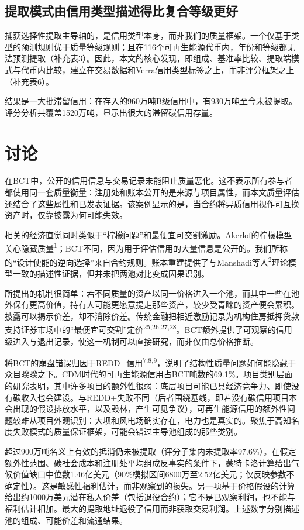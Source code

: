 \documentclass[12pt,a4paper]{article}
\begin{document}
\subsection*{提取模式由信用类型描述得比复合等级更好}

捕获选择性提取主导轴的，是信用类型本身，而非我们的质量框架。一个仅基于类型的预测规则优于质量等级规则；且在116个可再生能源代币内，年份和等级都无法预测提取（补充表3）。因此，本文的核心发现，即组成、基准率比较、提取端模式与代币内比较，建立在交易数据和Verra信用类型标签之上，而非评分框架之上（补充表6）。

结果是一大批滞留信用：在存入的960万吨B级信用中，有930万吨至今未被提取。评分分析共覆盖1520万吨，显示出很大的滞留碳信用存量。

\section*{讨论}
在BCT中，公开的信用信息与交易记录未能阻止质量恶化。这不表示所有参与者都使用同一套质量衡量：注册处和账本公开的是来源与项目属性，而本文质量评估还结合了这些属性和已发表证据。该案例显示的是，当合约将异质信用视作可互换资产时，仅靠披露为何可能失效。

相关的经济直觉同时类似于“柠檬问题”和最便宜可交割激励。Akerlof的柠檬模型关心隐藏质量\textsuperscript{1}；BCT不同，因为用于评估信用的大量信息是公开的。我们所称的“设计使能的逆向选择”来自合约规则。账本重建提供了与Manshadi等人\textsuperscript{2}理论模型一致的描述性证据，但并未把两池对比变成因果识别。

所提出的机制很简单：若不同质量的资产以同一价格进入一个池，而其中一些在池外保有更高价值，持有人可能更愿意提走那些资产，较少受青睐的资产便会累积。披露可以揭示价差，却不消除价差。传统金融把相近激励记录为机构住房抵押贷款支持证券市场中的“最便宜可交割”定价\textsuperscript{25,26,27,28}。BCT额外提供了可观察的信用级进入与退出记录，使这一机制可以直接研究，而非仅由总价格推断。

将BCT的崩盘错误归因于REDD+信用\textsuperscript{7,8,9}，说明了结构性质量问题如何能隐藏于众目睽睽之下。CDM时代的可再生能源信用占BCT吨数的69.1\%。项目类别层面的研究表明，其中许多项目的额外性很弱：底层项目可能已具经济竞争力、即使没有碳收入也会建设。与REDD+失败不同（后者围绕基线，即若没有碳信用项目本会出现的假设排放水平，以及毁林，产生可见争议），可再生能源信用的额外性问题较难从项目外观识别：大坝和风电场确实存在，电力也是真实的。聚焦于高知名度失败模式的质量保证框架，可能会错过主导池组成的那些类别。

超过900万吨名义上有效的抵消仍未被提取（评分子集内未提取率97.6\%）。在假定额外性范围、碳社会成本和注册处平均组成反事实的条件下，蒙特卡洛计算给出气候价值缺口中位数1.46亿美元（90\%模拟区间6800万至2.52亿美元；仅反映参数不确定性）。这是敏感性福利估计，而非观察到的损失。另一项基于价格假设的计算给出约1000万美元潜在私人价差（包括退役合约）；它不是已观察利润，也不能与福利估计相加。最大的提取地址退役了信用而非获取交易利润。上述数字分别描述池的组成、可能价差和流通结果。
\end{document}
